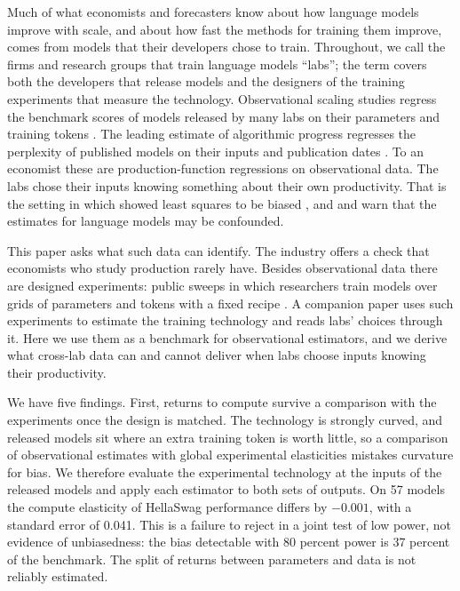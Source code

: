 \documentclass[AER,finalmode]{AEA}
\theoremstyle{definition}
\theoremstyle{remark}
\begin{document}
\maketitle

Much of what economists and forecasters know about how language models improve with scale, and about how fast the
methods for training them improve, comes from models that their developers chose to train. Throughout, we call the
firms and research groups that train language models ``labs''; the term covers both the developers that release models
and the designers of the training experiments that measure the technology. Observational scaling studies regress the
benchmark scores of models released by many labs on their parameters and training tokens
\citep{ruan2024observational,maiapolo2024sloth,owen2024predictable,mertens2026secret}. The leading estimate of
algorithmic progress regresses the perplexity of published models on their inputs and publication dates
\citep{ho2024algorithmic}. To an economist these are production-function regressions on observational data. The labs
chose their inputs knowing something about their own productivity. That is the setting in which
\citet{marschak1944random} showed least squares to be biased \citep[see][]{griliches1998production}, and
\citet{whitfill2025note} and \citet{konig2026validity} warn that the estimates for language models may be
confounded.

This paper asks what such data can identify. The industry offers a check that economists who study production rarely
have. Besides observational data there are designed experiments: public sweeps in which researchers train models over
grids of parameters and tokens with a fixed recipe
\citep{hoffmann2022training,bhagia2024establishing,gadre2024language}. A companion paper \citep{okar2026what} uses such
experiments to estimate the training technology and reads labs' choices through it. Here we use them as a benchmark
for observational estimators, and we derive what cross-lab data can and cannot deliver when labs choose inputs knowing
their productivity.

We have five findings. First, returns to compute survive a comparison with the experiments once the design is matched.
The technology is strongly curved, and released models sit where an extra training token is worth little, so a
comparison of observational estimates with global experimental elasticities mistakes curvature for bias. We therefore
evaluate the experimental technology at the inputs of the released models and apply each estimator to both sets of
outputs. On 57 models the compute elasticity of HellaSwag performance differs by $-0.001$, with a standard error of
0.041. This is a failure to reject in a joint test of low power, not evidence of unbiasedness: the bias detectable with
80 percent power is 37 percent of the benchmark. The split of returns between parameters and data is not reliably
estimated.
\end{document}
